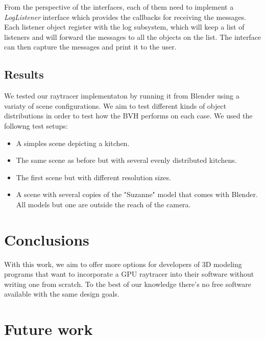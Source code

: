 \documentclass{vgtc}
\begin{document}
From the perspective of the interfaces, each of them need to implement
a \emph{LogListener} interface which provides the callbacks for
receiving the messages. Each listener object register with the log
subsystem, which will keep a list of listeners and will forward the
messages to all the objects on the list. The interface can then
capture the messages and print it to the user.

\subsection{Results}
\label{sec:results}


We tested our raytracer implementaton by running it from Blender using
a variaty of scene configurations. We aim to test different kinds of
object distributions in order to test how the BVH performs on each
case. We used the followng test setups:


\begin{itemize}
  \item A simples scene depicting a kitchen.
  \item The same scene as before but with several evenly distributed kitchens.
  \item The first scene but with different resolution sizes.
  \item A scene with several copies of the "Suzanne" model that comes
    with Blender. All models but one are outside the reach of the
    camera.                     %
\end{itemize}


\section{Conclusions}
\label{sec:conclusion}

With this work, we aim to offer more options for developers of 3D
modeling programs that want to incorporate a GPU raytracer into their
software without writing one from scratch. To the best of our
knowledge there's no free software available with the same design
goals.

\section{Future work}
\label{sec:future}






\end{document}
